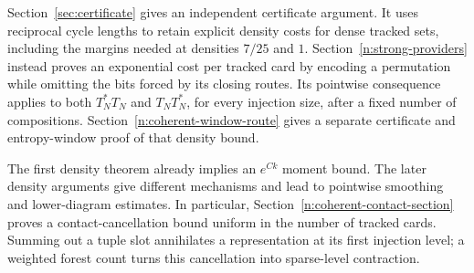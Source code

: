 Section~\ref{sec:certificate} gives an independent certificate argument.
It uses reciprocal cycle lengths to retain explicit density costs for
dense tracked sets, including the margins needed at densities $7/25$
and $1$. Section~\ref{n:strong-providers} instead proves an exponential
cost per tracked card by encoding a permutation while omitting the bits
forced by its closing routes. Its pointwise consequence applies to both
$T_N^*T_N$ and $T_NT_N^*$, for every injection size, after a fixed number
of compositions. Section~\ref{n:coherent-window-route} gives a separate
certificate and entropy-window proof of that density bound.

The first density theorem already implies an $e^{Ck}$ moment bound.
The later density arguments give different mechanisms and lead to
pointwise smoothing and lower-diagram estimates. In particular,
Section~\ref{n:coherent-contact-section} proves a contact-cancellation
bound uniform in the number of tracked cards. Summing out a tuple slot
annihilates a representation at its first injection level; a weighted
forest count turns this cancellation into sparse-level contraction.

